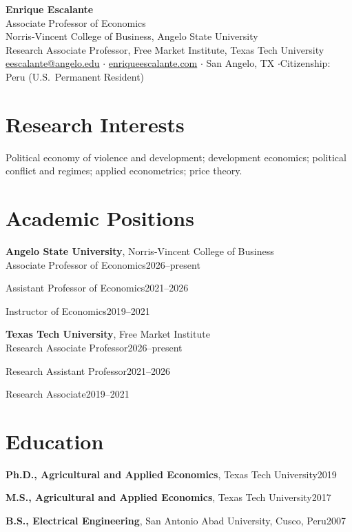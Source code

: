\documentclass[11pt,letterpaper]{article}
\newcommand{\daterow}[2]{\noindent #1\hfill #2\par\smallskip}
\begin{document}
{\LARGE\bfseries Enrique Escalante}\\[3pt]
{\large Associate Professor of Economics}\\[6pt]
Norris-Vincent College of Business, Angelo State University\\
Research Associate Professor, Free Market Institute, Texas Tech University\\[4pt]
\href{mailto:eescalante@angelo.edu}{eescalante@angelo.edu} \quad$\cdot$\quad
\href{https://enriqueescalante.com}{enriqueescalante.com} \quad$\cdot$\quad
San Angelo, TX \quad$\cdot$\quad Citizenship: Peru (U.S.\ Permanent Resident)

\section{Research Interests}
Political economy of violence and development; development economics; political conflict and regimes; applied econometrics; price theory.

\section{Academic Positions}
\textbf{Angelo State University}, Norris-Vincent College of Business\\[2pt]
\daterow{Associate Professor of Economics}{2026--present}
\daterow{Assistant Professor of Economics}{2021--2026}
\daterow{Instructor of Economics}{2019--2021}
\smallskip
\textbf{Texas Tech University}, Free Market Institute\\[2pt]
\daterow{Research Associate Professor}{2026--present}
\daterow{Research Assistant Professor}{2021--2026}
\daterow{Research Associate}{2019--2021}

\section{Education}
\daterow{\textbf{Ph.D., Agricultural and Applied Economics}, Texas Tech University}{2019}
\daterow{\textbf{M.S., Agricultural and Applied Economics}, Texas Tech University}{2017}
\daterow{\textbf{B.S., Electrical Engineering}, San Antonio Abad University, Cusco, Peru}{2007}

\end{document}
